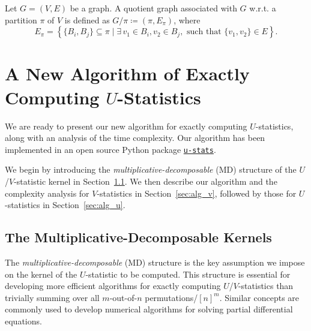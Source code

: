 \documentclass[letterpaper,11pt]{article}
\newcommand{\Chen}[1]{{\color{orange}{Chen: #1}}}
\newcommand{\pdfu}{\texorpdfstring{$U$}{U}}
\newcommand{\libref}[2]{\href{#2}{\texttt{#1}}}
\newcommand{\sPi}{\pi}
\def\package{\libref{u-stats}{https://github.com/zrq1706/U-Statistics-Python}}
\begin{document}
\begin{bibunit}[plainnat]
\begin{definition}
\label{def:quotient_graph}
Let $G = (V, E)$ be a graph. A quotient graph associated with $G$ w.r.t. a partition $\sPi$ of $V$ is defined as $G/\pi \coloneqq (\pi, E_{\pi})$, where
\begin{equation*}
    E_\pi = \left\{\{B_i,B_j\} \subseteq \pi \mid \exists \, v_1 \in B_i, v_2 \in B_j, \text{ such that } \{v_1, v_2\} \in E\right\}. 
\end{equation*}
\end{definition}


\section{A New Algorithm of Exactly Computing \pdfu{}-Statistics}
\label{sec:alg_u_v}

We are ready to present our new algorithm for exactly computing $U$-statistics, along with an analysis of the time complexity. Our algorithm has been implemented in an open source Python package \package{}. 

We begin by introducing the \emph{multiplicative-decomposable} (MD) structure of the $U$/$V$-statistic kernel in Section~\ref{sec:decomposition}. We then describe our algorithm and the complexity analysis for $V$-statistics in Section~\ref{sec:alg_v}, followed by those for $U$-statistics in Section~\ref{sec:alg_u}.


\subsection{The Multiplicative-Decomposable Kernels}
\label{sec:decomposition}

The \emph{multiplicative-decomposable} (MD) structure is the key assumption we impose on the kernel of the $U$-statistic to be computed. This structure is essential for developing more efficient algorithms for exactly computing $U$/$V$-statistics than trivially summing over all $m$-out-of-$n$ permutations/$[n]^{m}$. Similar concepts are commonly used to develop numerical algorithms for solving partial differential equations.


\end{bibunit}
\end{document}
